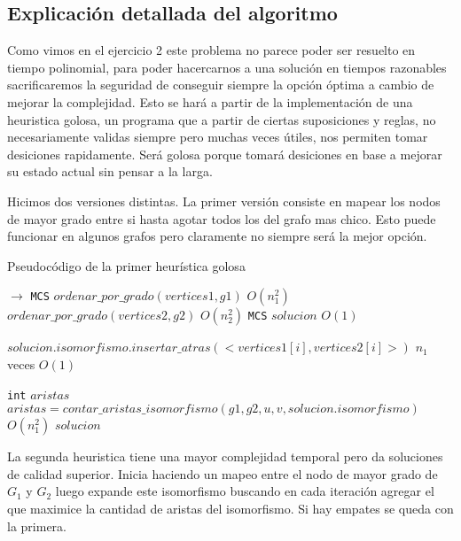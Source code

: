 \subsection{Explicación detallada del algoritmo}

Como vimos en el ejercicio 2 este problema no parece poder ser resuelto en tiempo polinomial, para poder hacercarnos a una solución en tiempos razonables sacrificaremos la seguridad de conseguir siempre la opción óptima a cambio de mejorar la complejidad. Esto se hará a partir de la implementación de una heuristica golosa, un programa que a partir de ciertas suposiciones y reglas, no necesariamente validas siempre pero muchas veces útiles, nos permiten tomar desiciones rapidamente. Será golosa porque tomará desiciones en base a mejorar su estado actual sin pensar a la larga.

Hicimos dos versiones distintas. La primer versión consiste en mapear los nodos de mayor grado entre si hasta agotar todos los del grafo mas chico. Esto puede funcionar en algunos grafos pero claramente no siempre será la mejor opción.

\begin{algorithm}[H]
  \begin{algorithmic}[1]
  \caption{Pseudocódigo de la primer heurística golosa}
  \label{algo:4-1}
     $\to$ \texttt{MCS}
      \State $ordenar\_por\_grado(vertices1, g1)$ 
        \Comment $O(n_1^2)$ 
      \State $ordenar\_por\_grado(vertices2, g2)$ 
        \Comment $O(n_2^2)$ 
      \State \texttt{MCS} $solucion$ 
        \Comment $O(1)$ 

	  \State  $solucion.isomorfismo.insertar\_atras(<vertices1[i],vertices2[i]>)$
      \Comment $n_1$ veces $O(1)$
    	  \EndFor

	  \State \texttt{int} $aristas$
	  \State $ aristas = contar\_aristas\_isomorfismo(g1,g2,u,v, solucion.isomorfismo)$
      \Comment $O(n_1^2)$
      \State \Return $solucion$
      \EndProcedure
	\end{algorithmic}
\end{algorithm}


La segunda heuristica tiene una mayor complejidad temporal pero da soluciones de calidad superior. Inicia haciendo un mapeo entre el nodo de mayor grado de $G_1$ y $G_2$ luego expande este isomorfismo buscando en cada iteración agregar el que maximice la cantidad de aristas del isomorfismo. Si hay empates se queda con la primera.


